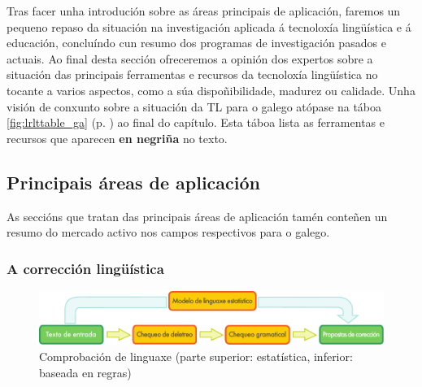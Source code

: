 \begin{multicols}{2}
Tras facer unha introdución sobre as áreas principais de aplicación, faremos un pequeno repaso da situación na investigación aplicada á tecnoloxía lingüística e á educación, concluíndo cun resumo dos programas de investigación pasados e actuais. Ao final desta sección ofreceremos a opinión dos expertos sobre a situación das principais ferramentas e recursos da tecnoloxía lingüística no tocante a varios aspectos, como a súa dispoñibilidade, madurez ou calidade. Unha visión de conxunto sobre a situación da TL para o galego atópase na táboa \ref{fig:lrlttable_ga} (p. \pageref{fig:lrlttable_ga}) ao final do capítulo.  Esta táboa lista as ferramentas e recursos que aparecen \textbf{en negriña} no texto.

\subsection{Principais áreas de aplicación} 

As seccións que tratan das principais áreas de aplicación tamén conteñen un resumo do mercado activo nos campos respectivos para o galego. 

\subsubsection{A corrección lingüística}

\begin{figure}[htb]
  \center
  \includegraphics[width=\textwidth]{../_media/galician/language_checking}
  \caption{Comprobación de linguaxe (parte superior: estatística, inferior: baseada en regras)}
  \label{fig:langcheckingaarch_ga}
\end{figure}


\end{multicols}
